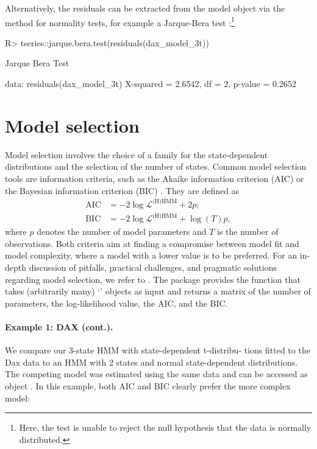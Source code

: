 \documentclass[article,shortnames]{jss}
\newcommand{\class}[1]{`\code{#1}'}
\newcommand{\fct}[1]{\code{#1()}}
\begin{document}
Alternatively, the residuals can be extracted from the model object via the \fct{residuals} method for normality tests, for example a Jarque-Bera test \citep{jar87}:\footnote{Here, the test is unable to reject the null hypothesis that the data is normally distributed.}

%
\begin{Schunk}
\begin{Sinput}
R> tseries::jarque.bera.test(residuals(dax_model_3t))
\end{Sinput}
\begin{Soutput}
	Jarque Bera Test

data:  residuals(dax_model_3t)
X-squared = 2.6542, df = 2, p-value = 0.2652
\end{Soutput}
\end{Schunk}
%

\section{Model selection} \label{sec:model_selection} %

Model selection involves the choice of a family for the state-dependent distributions and the selection of the number of states. Common model selection tools are information criteria, such as the Akaike information criterion (AIC) \citep{aka74} or the Bayesian information criterion (BIC) \citep{sch78}. They are defined as
\begin{align*}
\text{AIC} &= - 2 \log \mathcal{L}^\text{(H)HMM} + 2 p; \\
\text{BIC} &= - 2 \log \mathcal{L}^\text{(H)HMM} + \log(T) p,
\end{align*}
where $p$ denotes the number of model parameters and $T$ is the number of observations. Both criteria aim at finding a compromise between model fit and model complexity, where a model with a lower value is to be preferred. For an in-depth discussion of pitfalls, practical challenges, and pragmatic solutions regarding model selection, we refer to \cite{poh17}. The  package provides the \fct{compare\_models} function that takes (arbitrarily many) \class{fHMM\_model} objects as input and returns a matrix of the number of parameters, the log-likelihood value, the AIC, and the BIC. 

\paragraph{Example 1: DAX (cont.).} We compare our 3-state HMM with state-dependent t-distribu- tions fitted to the Dax data to an HMM with 2 states and normal state-dependent distributions. The competing model was estimated using the same data and can be accessed as object . In this example, both AIC and BIC clearly prefer the more complex model:
\end{document}
